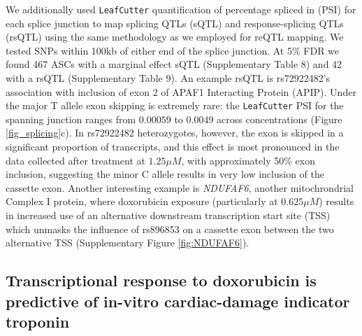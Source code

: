 \documentclass{article}
\begin{document}
We additionally used \texttt{LeafCutter} quantification of percentage spliced in (PSI) for each splice junction to map splicing QTLs (sQTL) and response-splicing QTLs (rsQTL) using the same methodology as we employed for reQTL mapping. We tested SNPs within 100kb of either end of the splice junction. At 5\% FDR we found 467 ASCs with a marginal effect sQTL (Supplementary Table 8) and 42 with a rsQTL (Supplementary Table 9). An example rsQTL is rs72922482's association with inclusion of exon 2 of APAF1 Interacting Protein (APIP). Under the major T allele exon skipping is extremely rare: the \texttt{LeafCutter} PSI for the spanning junction ranges from $0.00059$ to $0.0049$ across concentrations (Figure \ref{fig_splicing}c). In rs72922482 heterozygotes, however, the exon is skipped in a significant proportion of transcripts, and this effect is most pronounced in the data collected after treatment at $1.25 \mu M$, with approximately 50\% exon inclusion, suggesting the minor C allele results in very low inclusion of the cassette exon. Another interesting example is \emph{NDUFAF6}, another mitochrondrial Complex I protein, where doxorubicin exposure (particularly at $0.625 \mu M$) results in increased use of an alternative downstream transcription start site (TSS) which unmasks the influence of rs896853 on a cassette exon between the two alternative TSS (Supplementary Figure \ref{fig:NDUFAF6}).

\subsection*{Transcriptional response to doxorubicin is predictive of in-vitro cardiac-damage indicator troponin}
\end{document}
